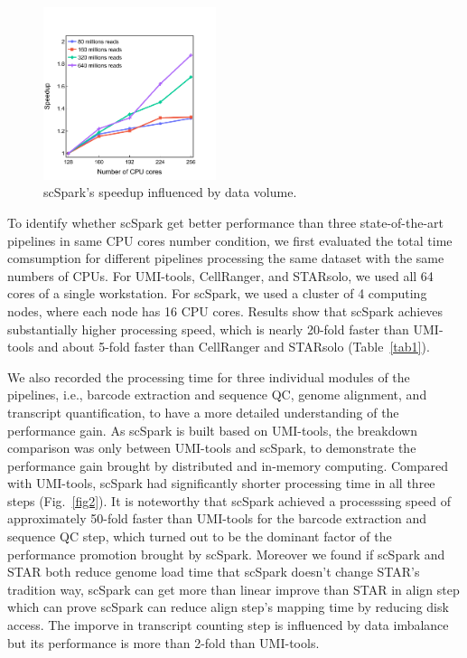 \documentclass[conference]{IEEEtran}
\begin{document}
\begin{figure}
	\centering
	\includegraphics[width=0.45\textwidth]{fig5.pdf}
	\caption{scSpark's speedup influenced by data volume.} \label{fig5}
\end{figure}

To identify whether scSpark get better performance than three state-of-the-art pipelines in same CPU cores number condition, we first evaluated the total time comsumption for different pipelines processing the same dataset with the same numbers of CPUs. 
For UMI-tools, CellRanger, and STARsolo, we used all 64 cores of a single workstation. 
For scSpark, we used a cluster of 4 computing nodes, where each node has 16 CPU cores. 
Results show that scSpark achieves substantially higher processing speed, which is nearly 20-fold faster than UMI-tools and about 5-fold faster than CellRanger and STARsolo (Table~\ref{tab1}). 

We also recorded the processing time for three individual modules of the pipelines, i.e., barcode extraction and sequence QC, genome alignment, and transcript quantification, to have a more detailed understanding of the performance gain. 
As scSpark is built based on UMI-tools, the breakdown comparison was only between UMI-tools and scSpark, to demonstrate the performance gain brought by distributed and in-memory computing.
Compared with UMI-tools, scSpark had significantly shorter processing time in all three steps (Fig.~\ref{fig2}).
It is noteworthy that scSpark achieved a processsing speed of approximately 50-fold faster than UMI-tools for the barcode extraction and sequence QC step, which turned out to be the dominant factor of the performance promotion brought by scSpark.
Moreover we found if scSpark and STAR both reduce genome load time that scSpark doesn't change STAR's tradition way, scSpark can get more than linear improve than STAR in align step which can prove scSpark can reduce align step's mapping time by reducing disk access.
The imporve in transcript counting step is influenced by data imbalance but its performance is more than 2-fold than UMI-tools.
\end{document}
